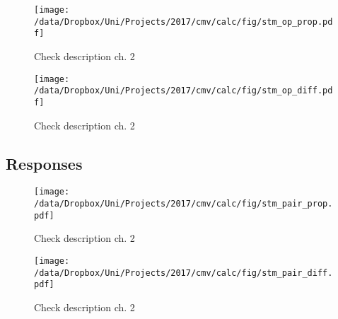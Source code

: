 \begin{figure}[h]
\centering
\texttt{[image: /data/Dropbox/Uni/Projects/2017/cmv/calc/fig/stm\_op\_prop.pdf]}
\caption{Check description ch. 2}
\end{figure}

\begin{figure}[h]
\centering
\texttt{[image: /data/Dropbox/Uni/Projects/2017/cmv/calc/fig/stm\_op\_diff.pdf]}
\caption{Check description ch. 2}
\end{figure}

\clearpage
\subsection{Responses}

\begin{figure}[h]
\centering
\texttt{[image: /data/Dropbox/Uni/Projects/2017/cmv/calc/fig/stm\_pair\_prop.pdf]}
\caption{Check description ch. 2}
\end{figure}

\begin{figure}[h]
\centering
\texttt{[image: /data/Dropbox/Uni/Projects/2017/cmv/calc/fig/stm\_pair\_diff.pdf]}
\caption{Check description ch. 2}
\end{figure}

